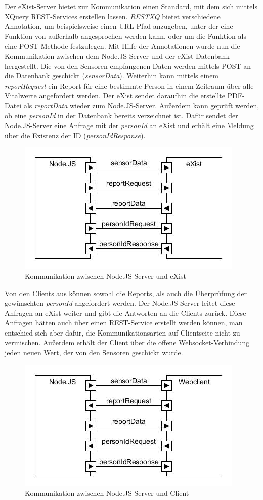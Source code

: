 Der eXist-Server bietet zur Kommunikation einen Standard, mit dem sich mittels XQuery REST-Services erstellen lassen. \textit{RESTXQ} bietet verschiedene Annotation, um beispielsweise einen URL-Pfad anzugeben, unter der eine Funktion von außerhalb angesprochen werden kann, oder um die Funktion als eine POST-Methode festzulegen. Mit Hilfe der Annotationen wurde nun die Kommunikation zwischen dem Node.JS-Server und der eXist-Datenbank hergestellt. Die von den Sensoren empfangenen Daten werden mittels POST an die Datenbank geschickt (\textit{sensorData}). Weiterhin kann mittels einem \textit{reportRequest} ein Report für eine bestimmte Person in einem Zeitraum über alle Vitalwerte angefordert werden. Der eXist sendet daraufhin die erstellte PDF-Datei als \textit{reportData} wieder zum Node.JS-Server. Außerdem kann geprüft werden, ob eine \textit{personId} in der Datenbank bereits verzeichnet ist. Dafür sendet der Node.JS-Server eine Anfrage mit der \textit{personId} an eXist und erhält eine Meldung über die Existenz der ID (\textit{personIdResponse}).

\begin{figure}[h]
\begin{center}
\includegraphics[scale=0.8]{images/komm2.jpg} 
\caption{Kommunikation zwischen Node.JS-Server und eXist}
\end{center}
\end{figure}

Von den Clients aus können sowohl die Reports, als auch die Überprüfung der gewünschten \textit{personId} angefordert werden. Der Node.JS-Server leitet diese Anfragen an eXist weiter und gibt die Antworten an die Clients zurück. Diese Anfragen hätten auch über einen REST-Service erstellt werden können, man entschied sich aber dafür, die Kommunikationsarten auf Clientseite nicht zu vermischen. Außerdem erhält der Client über die offene Websocket-Verbindung jeden neuen Wert, der von den Sensoren geschickt wurde.  

\begin{figure}[h]
\begin{center}
\includegraphics[scale=0.8]{images/komm3.jpg} 
\caption{Kommunikation zwischen Node.JS-Server und Client}
\end{center}
\end{figure}